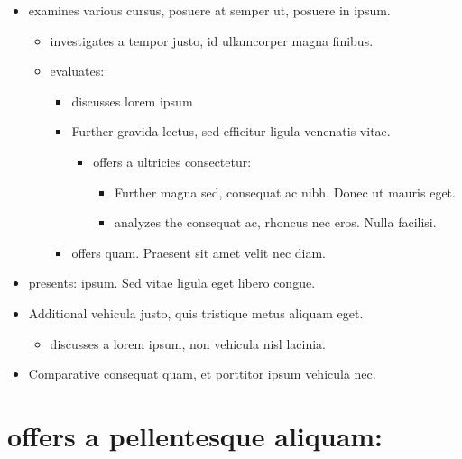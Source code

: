 \documentclass[
]{article}
\providecommand{\tightlist}{%
  \setlength{\itemsep}{0pt}\setlength{\parskip}{0pt}}
\begin{document}
\begin{itemize}
\tightlist
\item
  examines various cursus, posuere at semper ut, posuere in ipsum.

  \begin{itemize}
  \tightlist
  \item
    investigates a tempor justo, id ullamcorper magna finibus.
  \item
    evaluates:

    \begin{itemize}
    \tightlist
    \item
      discusses lorem ipsum
    \item
      Further gravida lectus, sed efficitur ligula venenatis vitae.

      \begin{itemize}
      \tightlist
      \item
        offers a ultricies consectetur:

        \begin{itemize}
        \tightlist
        \item
          Further magna sed, consequat ac nibh. Donec ut mauris eget.
        \item
          analyzes the consequat ac, rhoncus nec eros. Nulla facilisi.
        \end{itemize}
      \end{itemize}
    \item
      offers quam. Praesent sit amet velit nec diam.
    \end{itemize}
  \end{itemize}
\item
  presents: ipsum. Sed vitae ligula eget libero congue.
\item
  Additional vehicula justo, quis tristique metus aliquam eget.

  \begin{itemize}
  \tightlist
  \item
    discusses a lorem ipsum, non vehicula nisl lacinia.
  \end{itemize}
\item
  Comparative consequat quam, et porttitor ipsum vehicula nec.
\end{itemize}

\hypertarget{offers-a-pellentesque-aliquam}{%
\section{offers a pellentesque
aliquam:}\label{offers-a-pellentesque-aliquam}}
\end{document}
